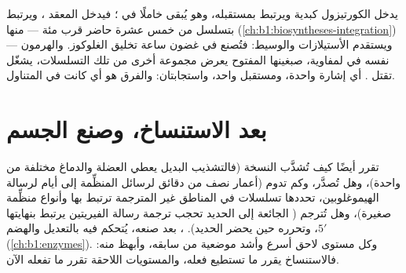 \begin{example}\label{ex:b1:expression-control:steroid}
يدخل الكورتيزول  كبدية ويرتبط بمستقبله، وهو  يُبقى
خاملًا في ؛ فيدخل المعقد ، ويرتبط بتسلسل من خمس عشرة
 حاضر قرب مئة  --- منها  
(\cref{ch:b1:biosyntheses-integration}) --- ويستقدم الأستيلازات
والوسيط: فتُصنع في غضون ساعة  تخليق الغلوكوز. والهرمون نفسه
في لمفاوية، صبغينها المفتوح يعرض مجموعة أخرى من تلك التسلسلات،
يشغّل  تقتل . أي إشارة واحدة، ومستقبل واحد،
واستجابتان: والفرق هو أي  كانت في المتناول.
\end{example}

\section{بعد الاستنساخ، وصنع الجسم}

\begin{proposition}\label{prop:b1:expression-control:posttranscriptional}
تقرر  أيضًا كيف تُشذَّب النسخة (فالتشذيب البديل
يعطي العضلة والدماغ  مختلفة من  واحدة)، وهل تُصدَّر،
وكم تدوم (أعمار نصف من دقائق لرسائل  المنظِّمة إلى أيام
لرسالة الهيموغلوبين، تحددها تسلسلات في المناطق غير المترجمة ترتبط
بها  وأنواع  منظِّمة صغيرة)، وهل تُترجم ( الجائعة
إلى الحديد تحجب ترجمة رسالة الفيريتين  يرتبط بنهايتها $5'$،
وتحرره حين يحضر الحديد). ، بعد صنعه، يُتحكم فيه بالتعديل
والهضم (\cref{ch:b1:enzymes}). وكل مستوى لاحق أسرع وأشد موضعية من
سابقه، وأبهظ منه: فالاستنساخ يقرر ما تستطيع  فعله، والمستويات
اللاحقة تقرر ما تفعله الآن.
\end{proposition}

